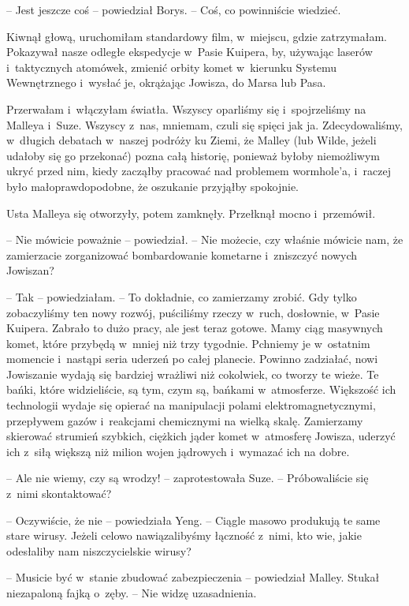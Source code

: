 \documentclass[oneside,polish,11pt,sfheadings]{mwbk}
\begin{document}
-- Jest jeszcze coś -- powiedział Borys. -- Coś, co powinniście wiedzieć. 

Kiwnął głową, uruchomiłam standardowy film, w~miejscu, gdzie
zatrzymałam. Pokazywał nasze odległe ekspedycje w~Pasie Kuipera, by,
używając laserów i~taktycznych atomówek, zmienić orbity komet w~kierunku
Systemu Wewnętrznego i~wysłać je, okrążając Jowisza, do Marsa lub Pasa.

Przerwałam i~włączyłam światła. Wszyscy oparliśmy się i~spojrzeliśmy na
Malleya i~Suze. Wszyscy z~nas, mniemam, czuli się spięci jak ja.
Zdecydowaliśmy, w~długich debatach w~naszej podróży ku Ziemi, że Malley
(lub Wilde, jeżeli udałoby się go przekonać) pozna całą historię,
ponieważ byłoby niemożliwym ukryć przed nim, kiedy zacząłby pracować nad
problemem wormhole'a, i~raczej było małoprawdopodobne, że oszukanie
przyjąłby spokojnie.

Usta Malleya się otworzyły, potem zamknęły. Przełknął mocno i~przemówił.

-- Nie mówicie poważnie -- powiedział. -- Nie możecie, czy właśnie mówicie
nam, że zamierzacie zorganizować bombardowanie kometarne i~zniszczyć
nowych Jowiszan?

-- Tak -- powiedziałam. -- To dokładnie, co zamierzamy zrobić. Gdy tylko
zobaczyliśmy ten nowy rozwój, puściliśmy rzeczy w~ruch, dosłownie, w~Pasie Kuipera. Zabrało to dużo pracy, ale jest teraz gotowe. Mamy ciąg
masywnych komet, które przybędą w~mniej niż trzy tygodnie. Pchniemy je w~ostatnim momencie i~nastąpi seria uderzeń po całej planecie. Powinno
zadziałać, nowi Jowiszanie wydają się bardziej wrażliwi niż cokolwiek,
co tworzy te wieże. Te bańki, które widzieliście, są tym, czym są,
bańkami w~atmosferze. Większość ich technologii wydaje się opierać na
manipulacji polami elektromagnetycznymi, przepływem gazów i~reakcjami
chemicznymi na wielką skalę. Zamierzamy skierować strumień szybkich,
ciężkich jąder komet w~atmosferę Jowisza, uderzyć ich z~siłą większą niż
milion wojen jądrowych i~wymazać ich na dobre.

-- Ale nie wiemy, czy są wrodzy! -- zaprotestowała Suze. -- Próbowaliście
się z~nimi skontaktować?

-- Oczywiście, że nie -- powiedziała Yeng. -- Ciągle masowo produkują te
same stare wirusy. Jeżeli celowo nawiązalibyśmy łączność z~nimi, kto
wie, jakie odesłaliby nam niszczycielskie wirusy?

-- Musicie być w~stanie zbudować zabezpieczenia -- powiedział Malley.
Stukał niezapaloną fajką o~zęby. -- Nie widzę uzasadnienia.
\end{document}
